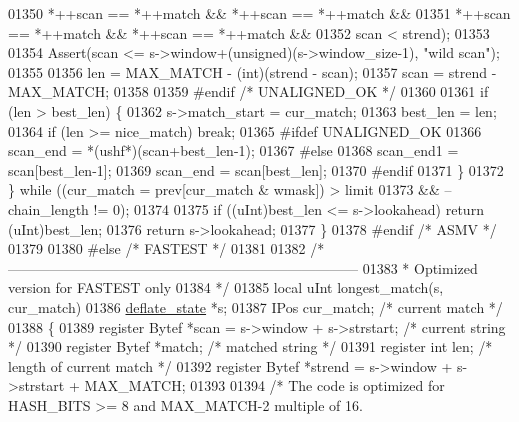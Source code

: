\begin{DoxyCode}
{01350                  *++scan == *++match && *++scan == *++match &&
01351                  *++scan == *++match && *++scan == *++match &&
01352                  scan < strend);
01353 
01354         Assert(scan <= s->window+(\textcolor{keywordtype}{unsigned})(s->window\_size-1), \textcolor{stringliteral}{"wild scan"});
01355 
01356         len = MAX\_MATCH - (int)(strend - scan);
01357         scan = strend - MAX\_MATCH;
01358 
01359 \textcolor{preprocessor}{#endif }\textcolor{comment}{/* UNALIGNED\_OK */}\textcolor{preprocessor}{}
01360 
01361         \textcolor{keywordflow}{if} (len > best\_len) \{
01362             s->match\_start = cur\_match;
01363             best\_len = len;
01364             \textcolor{keywordflow}{if} (len >= nice\_match) \textcolor{keywordflow}{break};
01365 \textcolor{preprocessor}{#ifdef UNALIGNED\_OK}
01366             scan\_end = *(ushf*)(scan+best\_len-1);
01367 \textcolor{preprocessor}{#else}
01368             scan\_end1  = scan[best\_len-1];
01369             scan\_end   = scan[best\_len];
01370 \textcolor{preprocessor}{#endif}
01371         \}
01372     \} \textcolor{keywordflow}{while} ((cur\_match = prev[cur\_match & wmask]) > limit
01373              && --chain\_length != 0);
01374 
01375     \textcolor{keywordflow}{if} ((uInt)best\_len <= s->lookahead) \textcolor{keywordflow}{return} (uInt)best\_len;
01376     \textcolor{keywordflow}{return} s->lookahead;
01377 \}
01378 \textcolor{preprocessor}{#endif }\textcolor{comment}{/* ASMV */}\textcolor{preprocessor}{}
01379 
01380 \textcolor{preprocessor}{#else }\textcolor{comment}{/* FASTEST */}\textcolor{preprocessor}{}
01381 
01382 \textcolor{comment}{/* ---------------------------------------------------------------------------}
01383 \textcolor{comment}{ * Optimized version for FASTEST only}
01384 \textcolor{comment}{ */}
01385 local uInt longest\_match(s, cur\_match)
01386     \hyperlink{structinternal__state}{deflate\_state} *s;
01387     IPos cur\_match;                             \textcolor{comment}{/* current match */}
01388 \{
01389     \textcolor{keyword}{register} Bytef *scan = s->window + s->strstart; \textcolor{comment}{/* current string */}
01390     \textcolor{keyword}{register} Bytef *match;                       \textcolor{comment}{/* matched string */}
01391     \textcolor{keyword}{register} \textcolor{keywordtype}{int} len;                           \textcolor{comment}{/* length of current match */}
01392     \textcolor{keyword}{register} Bytef *strend = s->window + s->strstart + MAX\_MATCH;
01393 
01394     \textcolor{comment}{/* The code is optimized for HASH\_BITS >= 8 and MAX\_MATCH-2 multiple of 16.}
}
\end{DoxyCode}
